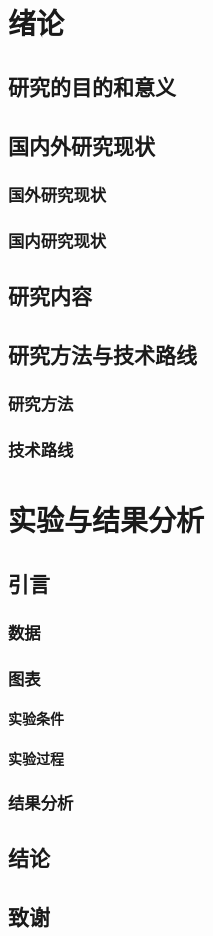 \documentclass{ctexbook}
\begin{document}
	\tableofcontents
	\chapter{绪论}
	\section{研究的目的和意义}
	\section{国内外研究现状}
	\subsection{国外研究现状}
	\subsection{国内研究现状}
	\section{研究内容}
	\section{研究方法与技术路线}
	\subsection{研究方法}
	\subsection{技术路线}

	\chapter{实验与结果分析}
	\section{引言}
	\subsection{数据}
	\subsection{图表}
	\subsubsection{实验条件}
	\subsubsection{实验过程}
	\subsection{结果分析}
	\section{结论}
	\section{致谢}
\end{document}
